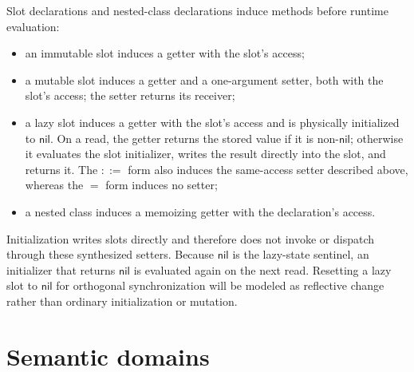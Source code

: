 \documentclass[11pt]{article}
\numberwithin{equation}{section}
\newcommand{\kw}[1]{\ensuremath{\mathsf{#1}}}
\newcommand{\nil}{\kw{nil}}
\begin{document}
Slot declarations and nested-class declarations induce methods before runtime
evaluation:
\begin{itemize}
\item an immutable slot induces a getter with the slot's access;
\item a mutable slot induces a getter and a one-argument setter, both with the
      slot's access; the setter returns its receiver;
\item a lazy slot induces a getter with the slot's access and is physically
      initialized to $\nil$.  On a read, the getter returns the stored value if
      it is non-$\nil$; otherwise it evaluates the slot initializer, writes the
      result directly into the slot, and returns it.  The $\kw{::=}$ form also
      induces the same-access setter described above, whereas the $\kw{=}$ form
      induces no setter;
\item a nested class induces a memoizing getter with the declaration's access.
\end{itemize}
Initialization writes slots directly and therefore does not invoke or dispatch
through these synthesized setters.  Because $\nil$ is the lazy-state sentinel,
an initializer that returns $\nil$ is evaluated again on the next read.
Resetting a lazy slot to $\nil$ for orthogonal synchronization will be modeled
as reflective change rather than ordinary initialization or mutation.

\section{Semantic domains}
\end{document}
